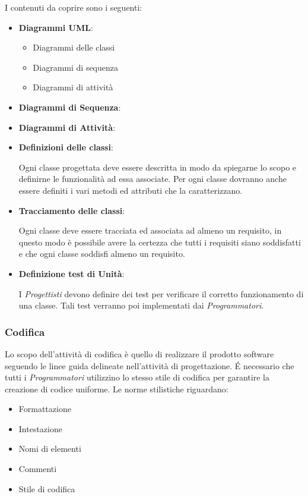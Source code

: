 I contenuti da coprire sono i seguenti:

\begin{itemize}
\item \textbf{Diagrammi UML}:
  \begin{itemize}
  \item Diagrammi delle classi
  \item Diagrammi di sequenza
  \item Diagrammi di attività
  \end{itemize}

\item \textbf{Diagrammi di Sequenza}:  %

\item \textbf{Diagrammi di Attività}:  %



\item \textbf{Definizioni delle classi}:

  Ogni classe progettata deve essere descritta in modo da spiegarne lo
  scopo e definirne le funzionalità ad essa associate. Per ogni classe
  dovranno anche essere definiti i vari metodi ed attributi che la
  caratterizzano. 

\item \textbf{Tracciamento delle classi}:

  Ogni classe deve essere tracciata ed associata ad almeno un
  requisito, in questo modo è possibile avere la certezza che tutti i
  requisiti siano soddisfatti e che ogni classe soddisfi almeno un
  requisito.

\item \textbf{Definizione test di Unità}:

I \textit{Progettisti} devono definire dei test per verificare il corretto funzionamento di una classe.
Tali test verranno poi implementati dai \textit{Programmatori}.

\end{itemize}

\subsubsection{Codifica}

Lo scopo dell'attività di codifica è quello di realizzare il prodotto
software seguendo le linee guida delineate nell'attività di
progettazione. 
\'E necessario che tutti i  \emph{Programmatori}  utilizzino lo stesso stile di codifica
per garantire la creazione di codice uniforme. Le norme stilistiche riguardano:
\begin{itemize}
\item Formattazione
\item Intestazione
\item Nomi di elementi
\item Commenti
\item Stile di codifica
\end{itemize}
